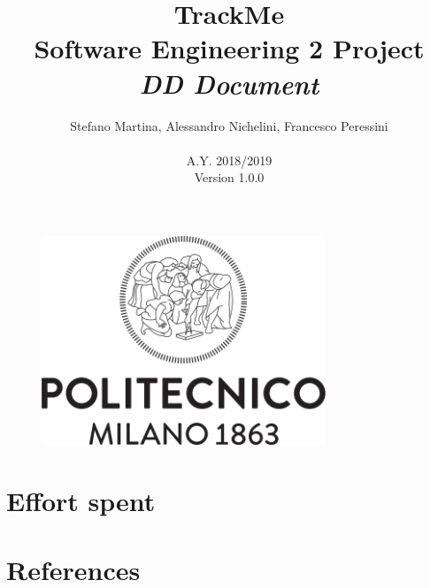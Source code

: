 \documentclass{article}
\begin{document}
	\begin{figure}[t]
	\centering
	\includegraphics[height=6.25cm,keepaspectratio]{Figures/logo}
	\end{figure}
	
	\title{TrackMe \\ Software Engineering 2 Project \\ 
			\textit{DD Document}}
	\author{Stefano Martina, Alessandro Nichelini, Francesco Peressini
		\\ \\ A.Y. 2018/2019 \\ Version 1.0.0}
		
\maketitle
\newpage

\tableofcontents
\newpage







\section{Effort spent}
\section{References}
\end{document}
